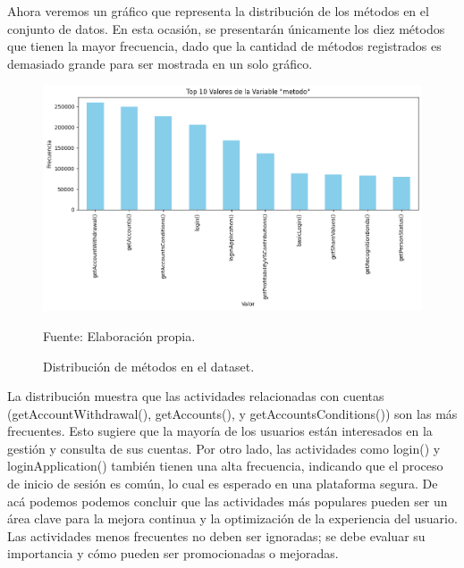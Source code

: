 Ahora veremos un gráfico que representa la distribución de los métodos en el conjunto de datos. En esta ocasión, se presentarán únicamente los diez métodos que tienen la mayor frecuencia, dado que la cantidad de métodos registrados es demasiado grande para ser mostrada en un solo gráfico.

\begin{figure}[H]
    \begin{minipage}[t]{0.9\textwidth}
        \caption{Distribución de métodos en el dataset.}
        \label{frecuencia-metodos}        
    \end{minipage}

    \vspace{10pt}

    \begin{minipage}[b]{1.0\textwidth}
        \centering
        \includegraphics[width=\textwidth]{img/frecuencia-metodo.png}        
    \end{minipage}

    \begin{minipage}[t]{0.9\textwidth}
        Fuente: Elaboración propia.
    \end{minipage}
\end{figure}

\sloppy
La distribución muestra que las actividades relacionadas con cuentas (getAccountWithdrawal(), getAccounts(), y getAccountsConditions()) son las más frecuentes. Esto sugiere que la mayoría de los usuarios están interesados en la gestión y consulta de sus cuentas. Por otro lado, las actividades como login() y loginApplication() también tienen una alta frecuencia, indicando que el proceso de inicio de sesión es común, lo cual es esperado en una plataforma segura. De acá podemos podemos concluir que las actividades más populares pueden ser un área clave para la mejora continua y la optimización de la experiencia del usuario. Las actividades menos frecuentes no deben ser ignoradas; se debe evaluar su importancia y cómo pueden ser promocionadas o mejoradas.

